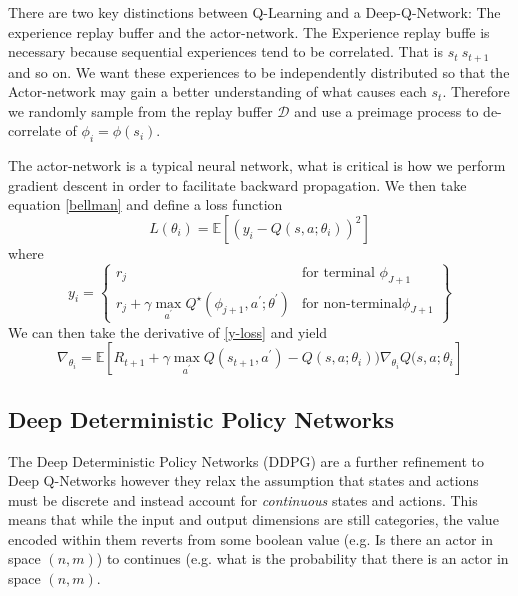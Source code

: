 \documentclass[doc, onecolumn, 12pt]{apa6}
\begin{document}
There are two key distinctions between Q-Learning and a Deep-Q-Network: The experience replay buffer and the actor-network. The Experience replay buffe is necessary because sequential experiences tend to be correlated. That is $s_{t} ~ s_{t+1}$ and so on.  We want these experiences to be independently distributed so that the Actor-network may gain a better understanding of what causes each $s_{t}$. Therefore we randomly sample from the replay buffer $\mathcal{D}$ and use a preimage process to de-correlate of $\phi_{i} = \phi(s_{i})$. 

The actor-network is a typical neural network, what is critical is how we perform gradient descent in order to facilitate backward propagation. We then take equation \ref{bellman} and define a loss function \begin{equation}
\label{loss-dqn}
L(\theta_{i}) = \mathbb{E}  \left[ (y_{i} -Q(s,a;\theta_{i}))^{2} \right]
\end{equation} 
where \begin{equation} \label{y-loss}
y_{i} = 
		\left\{\begin{array}{lr}
		 r_{j}  & \text{for terminal }  \phi_{J+1} \\
		r_{j} + \gamma  \max_{a ^{\prime}} Q^{\star} (\phi_{j+1}, a^{\prime}; \theta^{\prime})  &  \text{for non-terminal}  \phi_{J+1} 
		\end{array} \right\}
\end{equation}
We can then take the derivative of \ref{y-loss} and yield \begin{equation}
\label{loss-actor}
\nabla_{\theta_{i}} = \mathbb{E} \left[R_{t+1} + \gamma \max_{a^{\prime}} Q(s_{t+1},a^{\prime})-Q(s,  a; \theta_{i}))\nabla_{\theta_{i}}Q(s,a; \theta_{i} \right] 
\end{equation}

\FloatBarrier
\subsection{Deep Deterministic Policy Networks}
The Deep Deterministic Policy Networks (DDPG) are a further refinement to Deep Q-Networks however they relax the assumption that states and actions must be discrete and instead account for \emph{continuous} states and actions. This means that while the input and output dimensions are still categories, the value encoded within them reverts from some boolean value (e.g. Is there an actor in space $(n,m)$) to continues (e.g. what is the probability that there is an actor in space $(n,m)$. 
\end{document}
